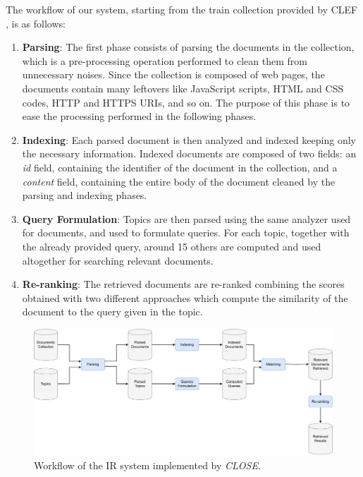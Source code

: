 The workflow of our system, starting from the train collection provided by \ac{CLEF} \cite{cleflongeval}, is as follows:
\begin{enumerate}
    \item \textbf{Parsing}: The first phase consists of parsing the documents in the collection, which is a pre-processing operation performed to clean them from unnecessary noises. Since the collection is composed of web pages, the documents contain many leftovers like JavaScript scripts, HTML and CSS codes, HTTP and HTTPS URIs, and so on. The purpose of this phase is to ease the processing performed in the following phases.

    \item \textbf{Indexing}: Each parsed document is then analyzed and indexed keeping only the necessary information. Indexed documents are composed of two fields: an \textit{id} field, containing the identifier of the document in the collection, and a \textit{content} field, containing the entire body of the document cleaned by the parsing and indexing phases.

    \item \textbf{Query Formulation}: Topics are then parsed using the same analyzer used for documents, and used to formulate queries. For each topic, together with the already provided query, around 15 others are computed and used altogether for searching relevant documents.

    \item \textbf{Re-ranking}: The retrieved documents are re-ranked combining the scores obtained with two different approaches which compute the similarity of the document to the query given in the topic.

\end{enumerate}

\begin{figure}[!h]
    \centering
    \includegraphics[width=\textwidth, height=\textheight, keepaspectratio]{figure/CLOSE_IR_Workflow (2).pdf}
    \caption{Workflow of the IR system implemented by \textit{CLOSE}.}
    \label{fig:CLOSE_IR_Workflow}
\end{figure}

